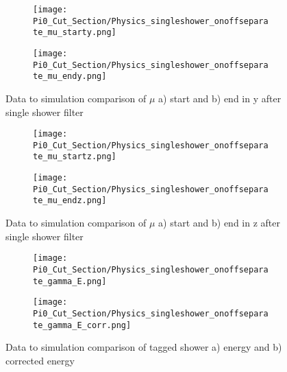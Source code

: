 \begin{figure}[H]
\centering
  \begin{subfigure}[t]{0.3\textwidth}
    \centering
\texttt{[image: Pi0\_Cut\_Section/Physics\_singleshower\_onoffseparate\_mu\_starty.png]}
  \caption{ }
  \end{subfigure} 
  \hspace{30mm}
  \begin{subfigure}[t]{0.3\textwidth}
    \centering
\texttt{[image: Pi0\_Cut\_Section/Physics\_singleshower\_onoffseparate\_mu\_endy.png]}
  \caption{ }
  \end{subfigure} 
\caption{ Data to simulation comparison of $\mu$ a) start and b) end in y after single shower filter }
\label{fig:physics_singleshower_y}
\end{figure}

\begin{figure}[H]
\centering
  \begin{subfigure}[t]{0.3\textwidth}
    \centering
\texttt{[image: Pi0\_Cut\_Section/Physics\_singleshower\_onoffseparate\_mu\_startz.png]}
  \caption{ }
  \end{subfigure} 
  \hspace{30mm}
  \begin{subfigure}[t]{0.3\textwidth}
    \centering
\texttt{[image: Pi0\_Cut\_Section/Physics\_singleshower\_onoffseparate\_mu\_endz.png]}
  \caption{ }
  \end{subfigure} 
\caption{ Data to simulation comparison of $\mu$ a) start and b) end in z after single shower filter }
\label{fig:physics_singleshower_z}
\end{figure}

\begin{figure}[H]
\centering
  \begin{subfigure}[t]{0.3\textwidth}
    \centering
\texttt{[image: Pi0\_Cut\_Section/Physics\_singleshower\_onoffseparate\_gamma\_E.png]}
  \caption{ }
  \end{subfigure} 
  \hspace{30mm}
  \begin{subfigure}[t]{0.3\textwidth}
    \centering
\texttt{[image: Pi0\_Cut\_Section/Physics\_singleshower\_onoffseparate\_gamma\_E\_corr.png]}
  \caption{ }
  \end{subfigure} 
\caption{ Data to simulation comparison of tagged shower a) energy and b) corrected energy }
\label{fig:physics_singleshower_e}
\end{figure}

